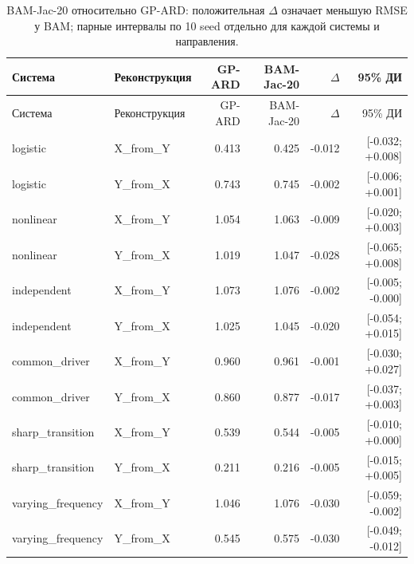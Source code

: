 \begin{longtable}{llrrrr}
\caption{BAM-Jac-20 относительно GP-ARD: положительная $\Delta$ означает меньшую RMSE у BAM; парные интервалы по 10 seed отдельно для каждой системы и направления.}\label{tab:metric-by-case}\\
\toprule
Система & Реконструкция & GP-ARD & BAM-Jac-20 & $\Delta$ & 95\% ДИ \\
\midrule
\endfirsthead
\toprule
Система & Реконструкция & GP-ARD & BAM-Jac-20 & $\Delta$ & 95\% ДИ \\
\midrule
\endhead
logistic & X\_from\_Y & 0.413 & 0.425 & -0.012 & [-0.032; +0.008] \\
logistic & Y\_from\_X & 0.743 & 0.745 & -0.002 & [-0.006; +0.001] \\
nonlinear & X\_from\_Y & 1.054 & 1.063 & -0.009 & [-0.020; +0.003] \\
nonlinear & Y\_from\_X & 1.019 & 1.047 & -0.028 & [-0.065; +0.008] \\
independent & X\_from\_Y & 1.073 & 1.076 & -0.002 & [-0.005; -0.000] \\
independent & Y\_from\_X & 1.025 & 1.045 & -0.020 & [-0.054; +0.015] \\
common\_driver & X\_from\_Y & 0.960 & 0.961 & -0.001 & [-0.030; +0.027] \\
common\_driver & Y\_from\_X & 0.860 & 0.877 & -0.017 & [-0.037; +0.003] \\
sharp\_transition & X\_from\_Y & 0.539 & 0.544 & -0.005 & [-0.010; +0.000] \\
sharp\_transition & Y\_from\_X & 0.211 & 0.216 & -0.005 & [-0.015; +0.005] \\
varying\_frequency & X\_from\_Y & 1.046 & 1.076 & -0.030 & [-0.059; -0.002] \\
varying\_frequency & Y\_from\_X & 0.545 & 0.575 & -0.030 & [-0.049; -0.012] \\
\bottomrule
\end{longtable}

